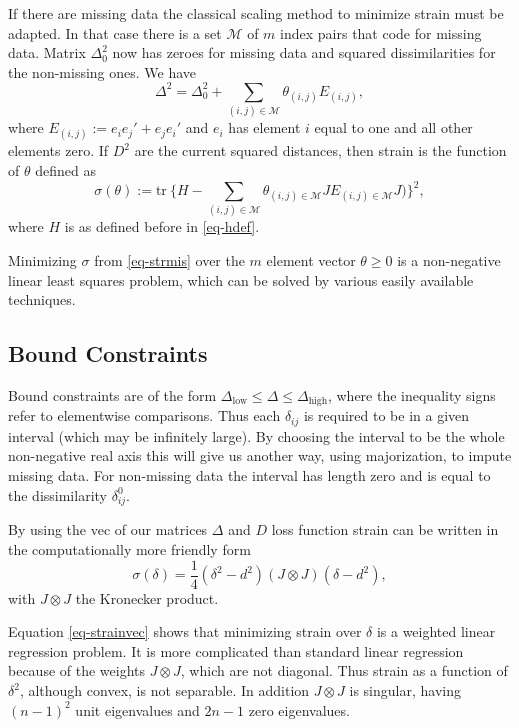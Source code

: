 \documentclass[
  12pt,
  letterpaper,
  DIV=11,
  numbers=noendperiod]{scrartcl}
\begin{document}
If there are missing data the classical scaling method to minimize
strain must be adapted. In that case there is a set \(\mathcal{M}\) of
\(m\) index pairs that code for missing data. Matrix \(\Delta_0^2\) now
has zeroes for missing data and squared dissimilarities for the
non-missing ones. We have \begin{equation}
\Delta^2=\Delta_0^2+\sum_{(i,j)\in\mathcal{M}}\theta_{(i,j)}E_{(i,j)},
\end{equation} where \(E_{(i,j)}:=e_ie_j'+e_je_i'\) and \(e_i\) has
element \(i\) equal to one and all other elements zero. If \(D^2\) are
the current squared distances, then strain is the function of \(\theta\)
defined as \begin{equation}
\sigma(\theta):=\text{tr}\ \{H-\sum_{(i,j)\in\mathcal{M}}\theta_{(i,j)\in\mathcal{M}}JE_{(i,j)\in\mathcal{M}}J)\}^2,
\label{eq-strmis}
\end{equation} where \(H\) is as defined before in \eqref{eq-hdef}.

Minimizing \(\sigma\) from \eqref{eq-strmis} over the \(m\) element
vector \(\theta\geq 0\) is a non-negative linear least squares problem,
which can be solved by various easily available techniques.

\subsection{Bound Constraints}\label{bound-constraints}

Bound constraints are of the form
\(\Delta_{\text{low}}\leq\Delta\leq\Delta_{\text{high}}\), where the
inequality signs refer to elementwise comparisons. Thus each
\(\delta_{ij}\) is required to be in a given interval (which may be
infinitely large). By choosing the interval to be the whole non-negative
real axis this will give us another way, using majorization, to impute
missing data. For non-missing data the interval has length zero and is
equal to the dissimilarity \(\delta_{ij}^0\).

By using the vec of our matrices \(\Delta\) and \(D\) loss function
strain can be written in the computationally more friendly form
\begin{equation}
\sigma(\delta)=\frac14(\delta^2 - d^2)(J\otimes J)(\delta - d^2)\label{eq-strainvec},
\end{equation} with \(J\otimes J\) the Kronecker product.

Equation \eqref{eq-strainvec} shows that minimizing strain over
\(\delta\) is a weighted linear regression problem. It is more
complicated than standard linear regression because of the weights
\(J\otimes J\), which are not diagonal. Thus strain as a function of
\(\delta^2\), although convex, is not separable. In addition
\(J\otimes J\) is singular, having \((n-1)^2\) unit eigenvalues and
\(2n-1\) zero eigenvalues.
\end{document}
